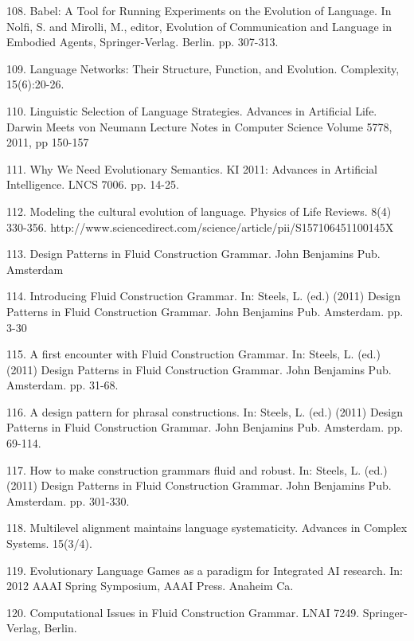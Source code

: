 108. \citet{Steels:10e} Babel: A Tool for Running Experiments on the Evolution of Language. In Nolfi, S. and Mirolli, M., editor, Evolution of Communication and Language in Embodied Agents, Springer-Verlag. Berlin. pp. 307-313.

109. \citet{sole:10f} Language Networks: Their Structure, Function, and Evolution. Complexity, 15(6):20-26. 

110. \citet{Bleys/Steels:11a} Linguistic Selection of Language Strategies. Advances in Artificial Life. Darwin Meets von Neumann Lecture Notes in Computer Science Volume 5778, 2011, pp 150-157

111. \citet{Steels:11b} Why We Need Evolutionary Semantics. KI 2011: Advances in Artificial Intelligence.  LNCS 7006. pp. 14-25. 

112. \citet{Steels:11c} Modeling the cultural evolution of language. Physics of Life Reviews. 8(4) 330-356. http://www.sciencedirect.com/science/article/pii/S157106451100145X

113. \citet{Steels:11d} Design Patterns in Fluid Construction Grammar. John Benjamins Pub. Amsterdam 

114. \citet{Steels:11e} Introducing Fluid Construction Grammar. In: Steels, L. (ed.) (2011) Design Patterns in Fluid Construction Grammar. John Benjamins Pub. Amsterdam. pp. 3-30

115. \citet{Steels:11f} A first encounter with Fluid Construction Grammar. In: Steels, L. (ed.) (2011) Design Patterns in Fluid Construction Grammar. John Benjamins Pub. Amsterdam. pp. 31-68. 

116. \citet{Steels:11g} A design pattern for phrasal constructions. In: Steels, L. (ed.) (2011) Design Patterns in Fluid Construction Grammar. John Benjamins Pub. Amsterdam. pp. 69-114. 

117. \citet{Steels:11h} How to make construction grammars fluid and robust. In: Steels, L. (ed.) (2011) Design Patterns in Fluid Construction Grammar. John Benjamins Pub. Amsterdam. pp. 301-330. 

118. \citet{Vantrijp:12a} Multilevel alignment maintains language systematicity. Advances in Complex Systems. 15(3/4). 

119. \citet{Steels:12b} Evolutionary Language Games as a paradigm for Integrated AI research. In: 2012 AAAI Spring Symposium, AAAI Press. 
Anaheim Ca. 

120. \citet{Steels:12c} Computational Issues in Fluid Construction Grammar. LNAI 7249. Springer-Verlag, Berlin. 

